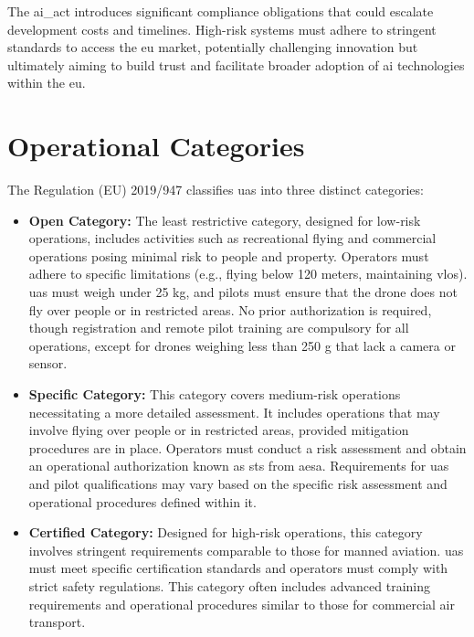 The \gls{ai_act} introduces significant compliance obligations that could escalate development costs and timelines. High-risk systems must adhere to stringent standards to access the \gls{eu} market, potentially challenging innovation but ultimately aiming to build trust and facilitate broader adoption of \gls{ai} technologies within the \gls{eu}.

\section{Operational Categories}
The Regulation (EU) 2019/947 \autocite{eu-947-2019} classifies \gls{uas} into three distinct categories:

\begin{itemize}
  \item \textbf{Open Category:} The least restrictive category, designed for low-risk operations, includes activities such as recreational flying and commercial operations posing minimal risk to people and property. Operators must adhere to specific limitations (e.g., flying below 120 meters, maintaining \gls{vlos}). \gls{uas} must weigh under 25 kg, and pilots must ensure that the drone does not fly over people or in restricted areas. No prior authorization is required, though registration and remote pilot training are compulsory for all operations, except for drones weighing less than 250 g that lack a camera or sensor.

  \item \textbf{Specific Category:} This category covers medium-risk operations necessitating a more detailed assessment. It includes operations that may involve flying over people or in restricted areas, provided mitigation procedures are in place. Operators must conduct a risk assessment and obtain an operational authorization known as \gls{sts} from \gls{aesa}. Requirements for \gls{uas} and pilot qualifications may vary based on the specific risk assessment and operational procedures defined within it.

  \item \textbf{Certified Category:} Designed for high-risk operations, this category involves stringent requirements comparable to those for manned aviation. \gls{uas} must meet specific certification standards and operators must comply with strict safety regulations. This category often includes advanced training requirements and operational procedures similar to those for commercial air transport.
\end{itemize}

